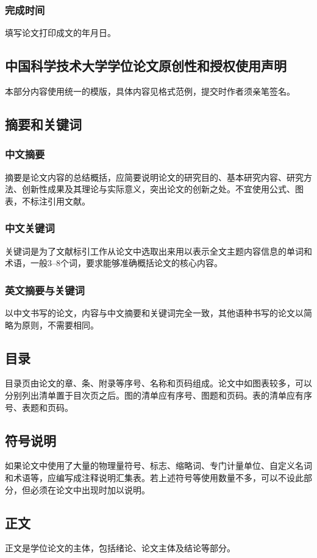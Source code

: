 \subsubsection{完成时间} 填写论文打印成文的年月日。

\subsection{中国科学技术大学学位论文原创性和授权使用声明}
本部分内容使用统一的模版，具体内容见格式范例，提交时作者须亲笔签名。

\subsection{摘要和关键词}
\subsubsection{中文摘要}
摘要是论文内容的总结概括，应简要说明论文的研究目的、基本研究内容、研究方法、创新性成果及其理论与实际意义，突出论文的创新之处。不宜使用公式、图表，不标注引用文献。
\subsubsection{中文关键词}
关键词是为了文献标引工作从论文中选取出来用以表示全文主题内容信息的单词和术语，一般3--8个词，要求能够准确概括论文的核心内容。
\subsubsection{英文摘要与关键词}
以中文书写的论文，内容与中文摘要和关键词完全一致，其他语种书写的论文以简略为原则，不需要相同。

\subsection{目录}
目录页由论文的章、条、附录等序号、名称和页码组成。论文中如图表较多，可以分别列出清单置于目次页之后。图的清单应有序号、图题和页码。表的清单应有序号、表题和页码。

\subsection{符号说明}
如果论文中使用了大量的物理量符号、标志、缩略词、专门计量单位、自定义名词和术语等，应编写成注释说明汇集表。若上述符号等使用数量不多，可以不设此部分，但必须在论文中出现时加以说明。

\subsection{正文}
正文是学位论文的主体，包括绪论、论文主体及结论等部分。
